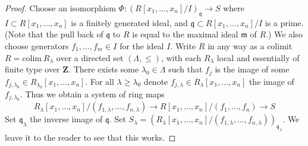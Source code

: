 \begin{proof}
Choose an isomorphism
$\Phi : (R[x_1,\ldots, x_n]/I)_{\mathfrak q} \to S$
where $I \subset R[x_1,\ldots,x_n]$ is a finitely generated ideal,
and $\mathfrak q \subset R[x_1,\ldots, x_n]/I$ is a prime.
(Note that the pull back of $\mathfrak q$ to $R$
is equal to the maximal ideal $\mathfrak m$ of $R$.)
We also choose generators $f_1,\ldots, f_m \in I$ for the ideal $I$.
Write $R$ in any way as a colimit $R = \text{colim}\ R_\lambda$
over a directed set $(\Lambda, \leq )$, with each $R_\lambda$
local and essentially of finite type over $\mathbf{Z}$.
There exists some $\lambda_0 \in \Lambda$ such that $f_j$ is the image
of some $f_{j, \lambda_0} \in R_{\lambda_0}[x_1,\ldots,x_n]$.
For all $\lambda \geq \lambda_0$ denote
$f_{j, \lambda} \in R_{\lambda}[x_1,\ldots,x_n]$ the image
of $f_{j, \lambda_0}$. Thus we obtain a system of ring maps
$$
R_\lambda[x_1,\ldots,x_n]/(f_{1,\lambda}, \ldots, f_{n,\lambda})
\to
R[x_1,\ldots, x_n]/(f_1,\ldots, f_n) \to S
$$
Set $\mathfrak q_\lambda$ the inverse image of $\mathfrak q$.
Set $S_\lambda =
(R_\lambda[x_1,\ldots,x_n]/(f_{1,\lambda}, \ldots, f_{n,\lambda}))_{\mathfrak 
q_\lambda}$. We leave it to the reader to see that this works.
\end{proof}

